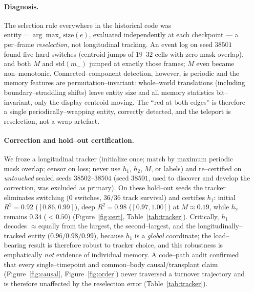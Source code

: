 \documentclass[11pt]{article}
\begin{document}
\paragraph{Diagnosis.} The selection rule everywhere in the historical code was
$\text{entity}=\arg\max_e \text{size}(e)$, evaluated independently at each checkpoint --- a per--frame
\emph{reselection}, not longitudinal tracking. An event log on seed $38501$ found five hard switches (centroid jumps
of $19$--$32$ cells with zero mask overlap), and both $M$ and $\mathrm{std}(m_-)$ jumped at exactly those frames;
$M$ even became non--monotonic. Connected--component detection, however, is periodic and the memory features are
permutation--invariant: whole--world translations (including boundary--straddling shifts) leave entity size and all
memory statistics bit--invariant, only the display centroid moving. The ``red at both edges'' is therefore a single
periodically--wrapping entity, correctly detected, and the teleport is reselection, not a wrap artefact.

\paragraph{Correction and hold--out certification.} We froze a longitudinal tracker (initialize once; match by
maximum periodic mask overlap; censor on loss; never use $h_1$, $h_2$, $M$, or labels) and re--certified on
\emph{untouched} sealed seeds $38502$--$38504$ (seed $38501$, used to discover and develop the correction, was
excluded as primary). On these hold--out seeds the tracker eliminates switching ($0$ switches, $36/36$ track
survival) and certifies $h_1$: initial $R^2=0.92$ ($[0.86,0.99]$), deep $R^2=0.98$ ($[0.97,1.00]$) at $M\approx0.19$,
while $h_2$ remains $0.34$ ($<0.50$) (Figure~\ref{fig:cert}, Table~\ref{tab:tracker}). Critically, $h_1$ decodes
$\approx$equally from the largest, the second--largest, and the longitudinally--tracked entity ($0.96/0.98/0.99$),
because $h_1$ is a \emph{global} coordinate; the load--bearing result is therefore robust to tracker choice, and
this robustness is emphatically \emph{not} evidence of individual memory. A code--path audit confirmed that every
single--timepoint and common--body causal/transplant claim (Figure~\ref{fig:causal}, Figure~\ref{fig:order}) never
traversed a turnover trajectory and is therefore unaffected by the reselection error (Table~\ref{tab:tracker}).
\end{document}
